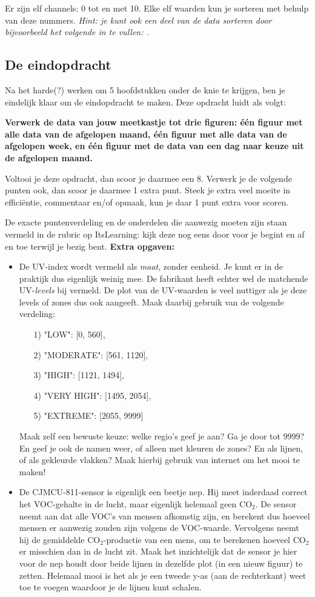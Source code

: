\documentclass[a4paper,11pt, fleqn]{article}
\begin{document}
Er zijn elf channels: 0 tot en met 10. Elke elf waarden kun je sorteren met behulp van deze nummers. {\it Hint: je kunt ook een deel van de data sorteren door bijvoorbeeld het volgende in te vullen: .}

\subsection{De eindopdracht}
Na het harde(?) werken om 5 hoofdstukken onder de knie te krijgen, ben je eindelijk klaar om de eindopdracht te maken. Deze opdracht luidt als volgt: 

{\bf Verwerk de data van jouw meetkastje tot drie figuren: \'e\'en figuur met alle data van de afgelopen maand, \'e\'en figuur met alle data van de afgelopen week, en \'e\'en figuur met de data van een dag naar keuze uit de afgelopen maand.}

Voltooi je deze opdracht, dan scoor je daarmee een 8. Verwerk je de volgende punten ook, dan scoor je daarmee 1 extra punt. Steek je extra veel moeite in effici\"entie, commentaar en/of opmaak, kun je daar 1 punt extra voor scoren.

De exacte puntenverdeling en de onderdelen die aanwezig moeten zijn staan vermeld in de rubric op ItsLearning: kijk deze nog eens door voor je begint en af en toe terwijl je bezig bent.
\bigbreak
{\bf Extra opgaven:}
\begin{itemize}
	\item De UV-index wordt vermeld als {\it maat}, zonder eenheid. Je kunt er in de praktijk dus eigenlijk weinig mee. De fabrikant heeft echter wel de matchende UV-{\it levels} bij vermeld. De plot van de UV-waarden is veel nuttiger als je deze levels of zones dus ook aangeeft. Maak daarbij gebruik van de volgende verdeling:
	\begin{itemize}
		\item[1)] "LOW": [0, 560],
		\item[2)] "MODERATE": [561, 1120],
		\item[3)] "HIGH": [1121, 1494],
		\item[4)] "VERY HIGH": [1495, 2054],
		\item[5)] "EXTREME": [2055, 9999] 
	\end{itemize}
	Maak zelf een bewuste keuze: welke regio's geef je aan? Ga je door tot 9999? En geef je ook de namen weer, of alleen met kleuren de zones? En als lijnen, of als gekleurde vlakken? Maak hierbij gebruik van internet om het mooi te maken!
	\item De CJMCU-811-sensor is eigenlijk een beetje nep. Hij meet inderdaad correct het VOC-gehalte in de lucht, maar eigenlijk helemaal geen CO$_2$. De sensor neemt aan dat alle VOC's van mensen afkomstig zijn, en berekent dus hoeveel mensen er aanwezig zouden zijn volgens de VOC-waarde. Vervolgens neemt hij de gemiddelde CO$_2$-productie van een mens, om te berekenen hoeveel CO$_2$ er misschien dan in de lucht zit. Maak het inzichtelijk dat de sensor je hier voor de nep houdt door beide lijnen in dezelfde plot (in een nieuw figuur) te zetten. Helemaal mooi is het als je een tweede y-as (aan de rechterkant) weet toe te voegen waardoor je de lijnen kunt schalen.
\end{itemize}
\end{document}
